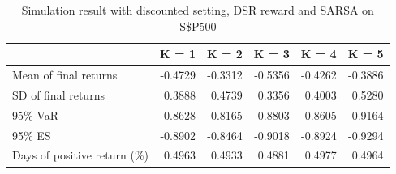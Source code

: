 \documentclass{article}
\begin{document}
\begin{table}[H]
\centering
\begin{tabular}{|l|r|r|r|r|r|} 
\hline
                             & \multicolumn{1}{l|}{K = 1} & \multicolumn{1}{l|}{K = 2} & \multicolumn{1}{l|}{K = 3} & \multicolumn{1}{l|}{K = 4} & \multicolumn{1}{l|}{K = 5}  \\ 
\hline
Mean of final returns        & -0.4729                    & -0.3312                    & -0.5356                    & -0.4262                    & -0.3886                     \\ 
\hline
SD of final returns          & 0.3888                     & 0.4739                     & 0.3356                     & 0.4003                     & 0.5280                      \\ 
\hline
95\% VaR                     & -0.8628                    & -0.8165                    & -0.8803                    & -0.8605                    & -0.9164                     \\ 
\hline
95\% ES                      & -0.8902                    & -0.8464                    & -0.9018                    & -0.8924                    & -0.9294                     \\ 
\hline
Days of positive return (\%) & 0.4963                     & 0.4933                     & 0.4881                     & 0.4977                     & 0.4964                      \\
\hline
\end{tabular}
\caption{Simulation result with discounted setting, DSR reward and SARSA on S\$P500}
\label{table21}
\end{table}
\end{document}
